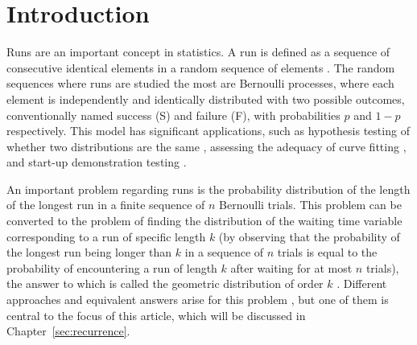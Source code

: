 \documentclass[oneside,12pt,final]{ucthesis-CA2012}
\begin{document}
\begin{mainmatter}

\pagestyle{fancy}
\renewcommand{\chaptermark}[1]{\markboth{{\sf #1 \hspace*{\fill} Chapter~\thechapter}}{} }
\renewcommand{\sectionmark}[1]{\markright{ {\sf Section~\thesection \hspace*{\fill} #1 }}}
\fancyhf{}

\makeatletter \if@twoside \fancyhead[LO]{\small \rightmark} \fancyhead[RE]{\small\leftmark} \else \fancyhead[LO]{\small\leftmark}
\fancyhead[RE]{\small\rightmark} \fi

\def\cleardoublepage{\clearpage\if@openright \ifodd\c@page\else
	\hbox{}
	\vspace*{\fill}
	\begin{center}
		This page intentionally left blank
	\end{center}
	\vspace{\fill}
	\thispagestyle{plain}
	\newpage
	\fi \fi}
\makeatother
\fancyfoot[c]{\textrm{\textup{\thepage}}} %
\fancyfoot[C]{\thepage}
\renewcommand{\headrulewidth}{0.4pt}

 { \fancyhf{} \fancyfoot[C]{\thepage}
\renewcommand{\headrulewidth}{0pt}
\renewcommand{\footrulewidth}{0pt}}

\chapter{Introduction}

Runs are an important concept in statistics.
A run is defined as a sequence of consecutive identical elements in a random sequence of elements
\cite[pp.~1--3]{Balakrishnan_Koutras_2002}.
The random sequences where runs are studied the most are Bernoulli processes,
where each element is independently and identically distributed with two possible outcomes,
conventionally named success (S) and failure (F),
with probabilities $p$ and $1-p$ respectively.
This model has significant applications,
such as hypothesis testing of whether two distributions are the same \cite{wald1940test},
assessing the adequacy of curve fitting \cite{deforest1876interpolation},
and start-up demonstration testing \cite{Hahn_Gage_1983}.

An important problem regarding runs is the probability distribution
of the length of the longest run in a finite sequence of $n$ Bernoulli trials.
This problem can be converted to the problem of finding the distribution of the waiting time
variable corresponding to a run of specific length $k$
(by observing that the probability of the longest run being longer than $k$ in a sequence of $n$ trials
is equal to the probability of encountering a run of length $k$ after waiting for at most $n$ trials),
the answer to which is called the geometric distribution of order $k$ \cite{Philippou_1983}.
Different approaches and equivalent answers arise for this problem
\cite[pp.~11--17]{Balakrishnan_Koutras_2002},
but one of them is central to the focus of this article,
which will be discussed in Chapter~\ref{sec:recurrence}.


\end{mainmatter}
\end{document}
